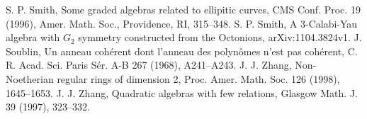 \documentclass[a4paper]{amsart}
\begin{document}
\begin{thebibliography}{99}
 S. P. Smith, Some graded algebras related to ellipitic curves, CMS Conf. Proc. 19 (1996), Amer.
Math. Soc., Providence, RI, 315--348.
 S. P. Smith, A 3-Calabi-Yau algebra with $G_2$ symmetry constructed from the Octonions, arXiv:1104.3824v1.
 J. Soublin, Un anneau coh\'{e}rent dont l'anneau des polyn\^{o}mes n'est pas coh\'{e}rent, C. R.
Acad. Sci. Paris S\'{e}r. A-B 267 (1968), A241--A243.
 J. J. Zhang, Non-Noetherian regular rings of dimension 2, Proc. Amer. Math. Soc. 126 (1998), 1645--1653.
 J. J. Zhang, Quadratic algebras with few relations, Glasgow Math. J. 39 (1997), 323--332.
\end{thebibliography}
\end{document}
